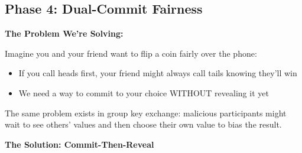 \documentclass[12pt,a4paper]{report}
\begin{document}
\subsection{Phase 4: Dual-Commit Fairness}

\textbf{The Problem We're Solving:}

Imagine you and your friend want to flip a coin fairly over the phone:
\begin{itemize}
\item If you call heads first, your friend might always call tails knowing they'll win
\item We need a way to commit to your choice WITHOUT revealing it yet
\end{itemize}

The same problem exists in group key exchange: malicious participants might wait to see others' values and then choose their own value to bias the result.

\textbf{The Solution: Commit-Then-Reveal}
\end{document}
